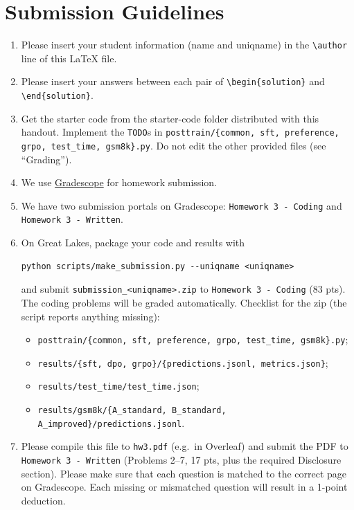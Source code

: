 \documentclass[11pt]{article}
\makeatletter
\newcommand{\coderelease}{the starter-code folder distributed with this handout}
\newenvironment{solution}{\begin{framed}\noindent\textbf{Solution:}\par
  \renewenvironment{figure}[1][]{\par\medskip\centering\def\@captype{figure}}{\par\medskip}}{\end{framed}}
\newcommand{\file}[1]{\texttt{#1}}
\makeatother
\begin{document}
\section*{Submission Guidelines}
\begin{enumerate}
  \item Please insert your student information (name and uniqname) in the \verb|\author| line of this \LaTeX{} file.
  \item Please insert your answers between each pair of \verb|\begin{solution}| and \verb|\end{solution}|.
  \item Get the starter code from \coderelease. Implement the \texttt{TODO}s in
        \file{posttrain/\{common, sft, preference, grpo, test\_time, gsm8k\}.py}. Do not edit the other provided
        files (see ``Grading'').
  \item We use \href{https://www.gradescope.com/courses/1384990}{Gradescope} for homework submission.
  \item We have two submission portals on Gradescope: \mbox{\texttt{Homework 3 - Coding}} and
        \mbox{\texttt{Homework 3 - Written}}.
  \item On Great Lakes, package your code and results with
        \begin{lstlisting}
python scripts/make_submission.py --uniqname <uniqname>\end{lstlisting}
        and submit \file{submission\_<uniqname>.zip} to \mbox{\texttt{Homework 3 - Coding}} (83 pts). The coding
        problems will be graded automatically. Checklist for the zip (the script reports anything missing):
        \begin{itemize}[nosep]
          \item \file{posttrain/\{common, sft, preference, grpo, test\_time, gsm8k\}.py};
          \item \file{results/\{sft, dpo, grpo\}/\{predictions.jsonl, metrics.json\}};
          \item \file{results/test\_time/test\_time.json};
          \item \file{results/gsm8k/\{A\_standard, B\_standard, A\_improved\}/predictions.jsonl}.
        \end{itemize}
  \item Please compile this file to \file{hw3.pdf} (e.g.\ in Overleaf) and submit the PDF to
        \mbox{\texttt{Homework 3 - Written}} (Problems 2--7, 17 pts, plus the required Disclosure section).
        {\color{red}Please make sure that each question is matched to the correct page on Gradescope. Each
        missing or mismatched question will result in a 1-point deduction.}
\end{enumerate}
\end{document}
